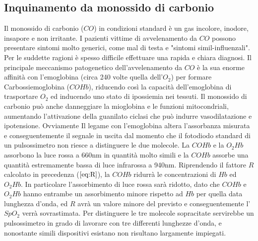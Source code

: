 \documentclass[12pt,a4paper, twoside, openright]{report}
\begin{document}
\subsection{Inquinamento da monossido di carbonio}

Il monossido di carbonio ($CO$) in condizioni standard è un gas incolore, inodore, insapore e non irritante. 
I pazienti vittime di avvelenamento da $CO$ possono presentare sintomi molto generici, come mal di testa e "sintomi simil-influenzali". 
Per le suddette ragioni è spesso difficile effettuare una rapida e chiara diagnosi. 
Il principale meccanismo patogenetico dell'avvelenamento da $CO$ è la sua enorme affinità con l'emoglobina (circa 240 volte quella dell'$O_2$) per formare Carbossiemoglobina ($COHb$), riducendo così la capacità dell'emoglobina di trasportare $O_2$ ed inducendo uno stato di ipossiemia nei tessuti. 
Il monossido di carbonio può anche danneggiare la mioglobina e le funzioni mitocondriali, aumentando l'attivazione della guanilato ciclasi che può indurre vasodilatazione e ipotensione. 
Ovviamente Il legame con l'emoglobina altera l'assorbanza misurata e conseguentemente il segnale in uscita dal momento che il fotodiodo standard di un pulsossimetro non riesce a distinguere le due molecole. 
La $COHb$ e la  $O_2Hb$ assorbono la luce rossa a 660nm in quantità molto simili e la $COHb$ assorbe una quantità estremamente bassa di luce infrarossa a 940nm. 
Riprendendo il fattore $R$ calcolato in precedenza ($\ref{eq:R}$), la $COHb$ ridurrà le concentrazioni di $Hb$ ed $O_2Hb$. 
In particolare l'assorbimento di luce rossa sarà ridotto, dato che $COHb$ e $O_2Hb$ hanno entrambe un assorbimento minore rispetto ad $Hb$ per quella data lunghezza d'onda, ed $R$ avrà un valore minore del previsto e conseguentemente l'$SpO_2$ verrà sovrastimata. 
Per distinguere le tre molecole sopracitate servirebbe un pulsossimetro in grado di lavorare con tre differenti lunghezze d'onda, e nonostante simili dispositivi esistano non risultano largamente impiegati.
\end{document}
